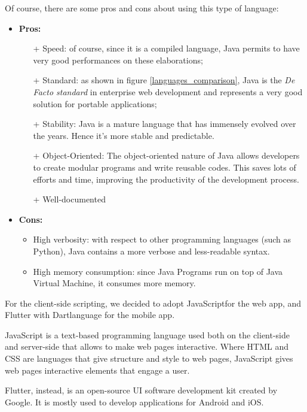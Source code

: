 \documentclass[table, 12pt]{article}
\begin{document}
Of course, there are some pros and cons about using this type of language:
\\\begin{itemize}
    \item \textbf{Pros:}
          \begin{itemize}
              \item[+] Speed: of course, since it is a compiled language, Java permits to have very good performances on these elaborations;
              \item[+] Standard: as shown in figure \ref{languages_comparison}, Java is the \textit{De Facto standard} in enterprise web development and represents a very good solution for portable applications;
              \item[+] Stability: Java is a mature language that has immensely evolved over the years. Hence it’s more stable and predictable.
              \item[+] Object-Oriented: The object-oriented nature of Java allows developers to create modular programs and write reusable codes. This saves lots of efforts and time, improving the productivity of the development process.
              \item[+] Well-documented
          \end{itemize}
    \item \textbf{Cons:}
          \begin{itemize}
              \item High verbosity: with respect to other programming languages (such as Python), Java contains a more verbose and less-readable syntax.
              \item High memory consumption: since Java Programs run on top of Java Virtual Machine, it consumes more memory.
          \end{itemize}
\end{itemize}

For the client-side scripting, we decided to adopt JavaScript\texttrademark  for the web app, and Flutter with Dart\texttrademark  language for the mobile app.

JavaScript is a text-based programming language used both on the client-side and server-side that allows to make web pages interactive. Where HTML and CSS are languages that give structure and style to web pages, JavaScript gives web pages interactive elements that engage a user.

Flutter, instead, is an open-source UI software development kit created by Google. It is mostly used to develop applications for Android and iOS.
\end{document}
